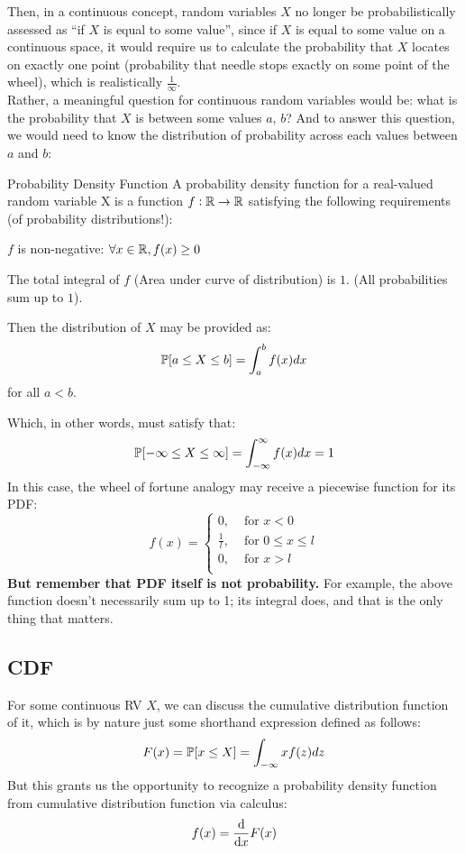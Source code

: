 Then, in a continuous concept, random variables $X$ no longer be probabilistically assessed as ``if $X$ is equal to some value'', since if $X$ is equal to some value on a continuous space, it would require us to calculate the probability that $X$ locates on exactly one point (probability that needle stops exactly on some point of the wheel), which is realistically $\frac{1}{\infty}$. \\
Rather, a meaningful question for continuous random variables would be: what is the probability that $X$ is between some values $a$, $b$? And to answer this question, we would need to know the distribution of probability across each values between $a$ and $b$:
\begin{ln-define}{Probability Density Function}{}
    A probability density function for a real-valued random variable X is a function $f: \R \rightarrow \R$ satisfying the following requirements (of probability distributions!):
    \begin{bindenum}
        \item $f$ is non-negative: $\forall x \in \R, f(x) \geq 0$
        \item The total integral of $f$ (Area under curve of distribution) is $1$. (All probabilities sum up to $1$).
    \end{bindenum}
    Then the distribution of $X$ may be provided as:
    \[
        \P[a \leq X \leq b] = \int_a^b f(x) dx
    \]
    for all $a < b$.
\end{ln-define}
Which, in other words, must satisfy that:
\[
    \P[-\infty \leq X \leq \infty] = \int_{-\infty}^{\infty} f(x) dx = 1
\]
In this case, the wheel of fortune analogy may receive a piecewise function for its PDF:
\[
    f(x) = 
    \begin{cases}
        0, &\text{ for $x < 0$} \\
        \frac{1}{l}, &\text{ for $0 \leq x \leq l$} \\
        0, &\text{ for $x > l$} \\
    \end{cases}
\]
\textbf{But remember that PDF itself is not probability.} For example, the above function doesn't necessarily sum up to 1; its integral does, and that is the only thing that matters.

\subsection{CDF}
For some continuous RV $X$, we can discuss the cumulative distribution function of it, which is by nature just some shorthand expression defined as follows:
\[
    F(x) = \P[x \leq X] = \int_{-\infty}{x} f(z) dz
\]
But this grants us the opportunity to recognize a probability density function from cumulative distribution function via calculus:
\[
    f(x) = \dv{}{x} F(x)
\]

